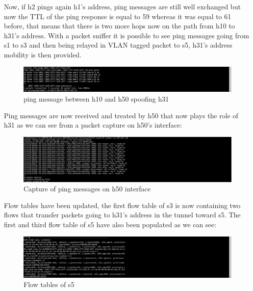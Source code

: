 \documentclass{article}
\begin{document}
Now, if h2 pings again h1's address, ping messages are still well
exchanged but now the TTL of the ping response is equal to 59 whereas
it was equal to 61 before, that means that there is two more hops now
on the path from h10 to h31's address. With a packet sniffer it is
possible to see ping messages going from s1 to s3 and then being
relayed in VLAN tagged packet to s5, h31's address mobility is then
provided.

\begin{figure}[h!]
  \centering
    \includegraphics[trim = 0mm 0mm 237mm 0mm,clip,scale=0.5]{reportPictures/h10_ping_h31spoofed.png}
  \caption{ping message between h10 and h50 spoofing h31}
\end{figure}


Ping messages are now received and treated by h50 that now plays the
role of h31 as we can see from a packet capture on h50's interface:

\begin{figure}[h!]
  \centering
    \includegraphics[trim = 0mm 0mm 237mm 0mm,clip,scale=0.5]{reportPictures/h50_tcpdump.png}
  \caption{Capture of ping messages on h50 interface}
\end{figure}

Flow tables have been updated, the first flow table of s3 is now
containing two flows that transfer packets going to h31's address in
the tunnel toward s5. The first and third flow table of s5 have
also been populated as we can see:

\begin{figure}[h!]
  \centering
    \includegraphics[trim = 0mm 0mm 237mm 0mm,clip,scale=0.5]{reportPictures/s5_dumpflows.png}
  \caption{Flow tables of s5}
\end{figure}
\end{document}

